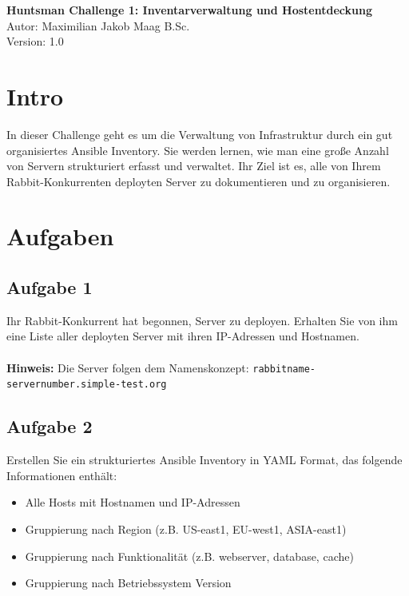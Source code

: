 \documentclass{article}
\begin{document}
    \begin{center}
        \Large \textbf{Huntsman Challenge 1: Inventarverwaltung und Hostentdeckung} \\ [6pt]
        \normalsize
        Autor: Maximilian Jakob Maag B.Sc. \\
        Version: 1.0
    \end{center}

    \section{Intro}
    In dieser Challenge geht es um die Verwaltung von Infrastruktur durch ein gut organisiertes Ansible Inventory.
    Sie werden lernen, wie man eine große Anzahl von Servern strukturiert erfasst und verwaltet.
    Ihr Ziel ist es, alle von Ihrem Rabbit-Konkurrenten deployten Server zu dokumentieren und zu organisieren.

    \section{Aufgaben}

    \subsection{Aufgabe 1}
    Ihr Rabbit-Konkurrent hat begonnen, Server zu deployen. Erhalten Sie von ihm eine Liste aller deployten Server mit ihren IP-Adressen und Hostnamen.
    \\ \\
    \textbf{Hinweis:} Die Server folgen dem Namenskonzept: \texttt{rabbitname-servernumber.simple-test.org}

    \subsection{Aufgabe 2}
    Erstellen Sie ein strukturiertes Ansible Inventory in YAML Format, das folgende Informationen enthält:
    \begin{itemize}
        \item Alle Hosts mit Hostnamen und IP-Adressen
        \item Gruppierung nach Region (z.B. US-east1, EU-west1, ASIA-east1)
        \item Gruppierung nach Funktionalität (z.B. webserver, database, cache)
        \item Gruppierung nach Betriebssystem Version
    \end{itemize}
\end{document}
